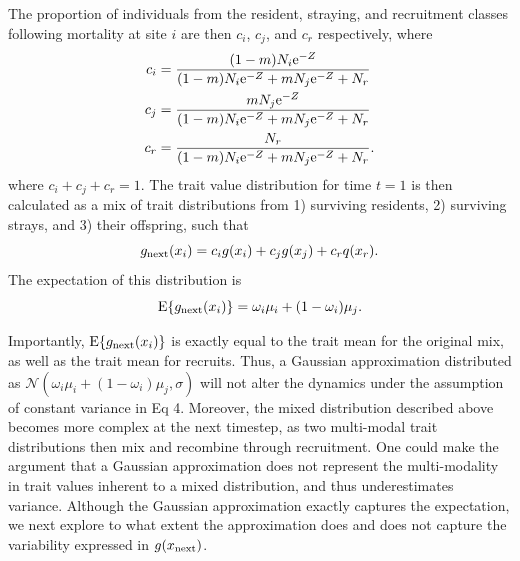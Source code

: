 \documentclass{revtex4}
\begin{document}
The proportion of individuals from the resident, straying, and recruitment classes following mortality at site $i$ are then $c_i$, $c_j$, and $c_r$ respectively, where
\begin{align}
c_i &= \frac{(1-m)N_i{\rm e}^{-Z}}{(1-m)N_i{\rm e}^{-Z} + m N_j{\rm e}^{-Z} + N_r} \\ \nonumber
c_j &= \frac{m N_j{\rm e}^{-Z}}{(1-m)N_i{\rm e}^{-Z} + m N_j{\rm e}^{-Z} + N_r} \\ \nonumber
c_r &= \frac{N_r}{(1-m)N_i{\rm e}^{-Z} + m N_j{\rm e}^{-Z} + N_r}.
\end{align}
where $c_i + c_j + c_r= 1$.
The trait value distribution for time $t=1$ is then calculated as a mix of trait distributions from 1) surviving residents, 2) surviving strays, and 3) their offspring, such that
\begin{equation}
  g_{{\rm next}}(x_i) = c_i g(x_i) + c_j g(x_j) + c_r q(x_r).
\end{equation}
The expectation of this distribution is
\begin{equation}
{\rm E}\{g_{\rm next}(x_i)\}=\omega_i\mu_i + (1-\omega_i)\mu_j.
\end{equation}


Importantly, ${\rm E}\{g_{{\rm next}}(x_i)\}$ is exactly equal to the trait mean for the original mix, as well as the trait mean for recruits.
Thus, a Gaussian approximation distributed as $\mathcal{N}(\omega_i\mu_i + (1-\omega_i)\mu_j,\sigma)$ will not alter the dynamics under the assumption of constant variance in Eq 4.
Moreover, the mixed distribution described above becomes more complex at the next timestep, as two multi-modal trait distributions then mix and recombine through recruitment.
One could make the argument that a Gaussian approximation does not represent the multi-modality in trait values inherent to a mixed distribution, and thus underestimates variance.
Although the Gaussian approximation exactly captures the expectation, we next explore to what extent the approximation does and does not capture the variability expressed in $g(x_{\rm next})$.
\end{document}
